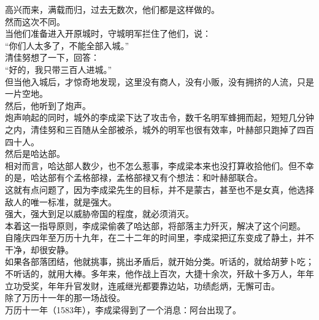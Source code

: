 \begin{multicols}{\theparacolNo}
高兴而来，满载而归，过去无数次，他们都是这样做的。\\

然而这次不同。\\

当他们准备进入开原城时，守城明军拦住了他们，说：\\

“你们人太多了，不能全部入城。”\\

清佳努想了一下，回答：\\

“好的，我只带三百人进城。”\\

但当他入城后，才惊奇地发现，这里没有商人，没有小贩，没有拥挤的人流，只是一片空地。\\

然后，他听到了炮声。\\

炮声响起的同时，城外的李成梁下达了攻击令，数千名明军蜂拥而起，短短几分钟之内，清佳努和三百随从全部被杀，城外的明军也很有效率，叶赫部只跑掉了四百四十人。\\

然后是哈达部。\\

相对而言，哈达部人数少，也不怎么惹事，李成梁本来也没打算收拾他们。但不幸的是，哈达部有个孟格部禄，孟格部禄又有个想法：和叶赫部联合。\\

这就有点问题了，因为李成梁先生的目标，并不是蒙古，甚至也不是女真，他选择敌人的唯一标准，就是强大。\\

强大，强大到足以威胁帝国的程度，就必须消灭。\\

本着这一指导原则，李成梁偷袭了哈达部，将部落主力歼灭，解决了这个问题。\\

自隆庆四年至万历十九年，在二十二年的时间里，李成梁把辽东变成了静土，并不干净，却很安静。\\

如果各部落团结，他就挑事，挑出矛盾后，就开始分类。听话的，就给胡萝卜吃；不听话的，就用大棒。多年来，他作战上百次，大捷十余次，歼敌十多万人，年年立功受奖，年年升官发财，连戚继光都要靠边站，功绩彪炳，无懈可击。\\

除了万历十一年的那一场战役。\\

万历十一年（1583年），李成梁得到了一个消息：阿台出现了。\\


\end{multicols}
